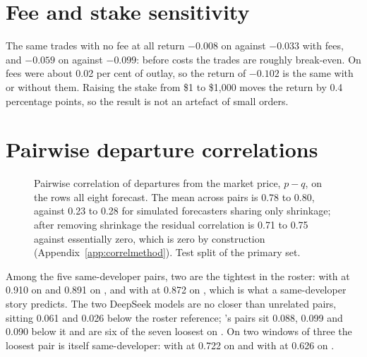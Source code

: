 \section{Fee and stake sensitivity}
\label{app:feesensitivity}
The same trades with no fee at all return $-0.008$ on \winB against $-0.033$
with fees, and $-0.059$ on \winC against $-0.099$: before costs the \winB trades
are roughly break-even. On \winA fees were about 0.02 per cent of outlay, so the
return of $-0.102$ is the same with or without them. Raising the stake from \$1 to \$1{,}000 moves the
\kalshi return by 0.4 percentage points, so the result is not an artefact of
small orders.

\section{Pairwise departure correlations}
\label{app:pairdetail}
\begin{figure}[!tbp]
\centering

\caption{Pairwise correlation of departures from the market price, $p-q$, on the rows all
eight forecast. The mean across pairs is 0.78 to 0.80, against 0.23 to 0.28 for simulated
forecasters sharing only shrinkage; after removing shrinkage the residual correlation is 0.71
to 0.75 against essentially zero, which is zero by construction (Appendix~\ref{app:correlmethod}). Test split of the primary set.}
\label{fig:correlated}
\end{figure}

Among the five same-developer pairs, two are the tightest in the roster:
\mKimiKTwoFive with \mKimiKTwoSix at 0.910 on \winB and 0.891 on \winC, and
\mGptFiveTwo with \mGptFiveFive at 0.872 on \winB, which is what a
same-developer story predicts. The two DeepSeek models are no closer than
unrelated pairs, sitting 0.061 and 0.026 below the roster reference;
\mGptOss's pairs sit 0.088, 0.099 and 0.090 below it and are six of the seven
loosest on \winB. On two windows of three the loosest pair is itself
same-developer: \mGptFiveTwo with \mGptOss at 0.722 on \winA and \mGptFiveFive
with \mGptOss at 0.626 on \winC.

